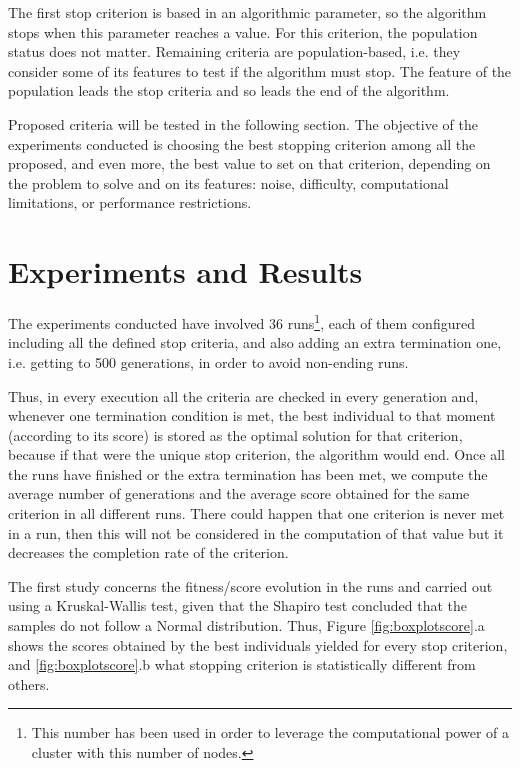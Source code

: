 \documentclass[runningheads,a4paper]{llncs}
\begin{document}
The first stop criterion is based in an algorithmic parameter, so the algorithm stops when this parameter reaches a value. For this criterion, the population status does not matter. Remaining criteria are population-based, i.e. they consider some of its features to test if the algorithm must stop. The feature of the population leads the stop criteria and so leads the end of the algorithm. 

Proposed criteria will be tested in the following section. The objective of the experiments conducted is choosing the best stopping criterion among all the proposed, and even more, the best value to set on that criterion, depending on the problem to solve and on its features: noise, difficulty, computational limitations, or performance restrictions.


%
%
\section{Experiments and Results}
\label{sec:res}

The experiments conducted have involved 36 runs\footnote{This number has been used in order to leverage the computational power of a cluster with this number of nodes.}, each of them configured including all the defined stop criteria, and also adding an extra termination one, i.e. getting to 500 generations, in order to avoid non-ending runs.

Thus, in every execution all the criteria are checked in every generation and, whenever one termination condition is met, the best individual to that moment (according to its score) is stored as the optimal solution for that criterion, because if that were the unique stop criterion, the algorithm would end.
Once all the runs have finished or the extra termination has been met, we compute the average number of generations and the average score obtained for the same criterion in all different runs. There could happen that one criterion is never met in a run, then this will not be considered in the computation of that value but it decreases the completion rate of the criterion. 

The first study concerns the fitness/score evolution in the runs and carried out using a Kruskal-Wallis test, given that the Shapiro test concluded that the samples do not follow a Normal distribution. Thus, Figure \ref{fig:boxplotscore}.a shows the scores obtained by the best individuals yielded for every stop criterion, and \ref{fig:boxplotscore}.b what stopping criterion is statistically different from others.
\end{document}
